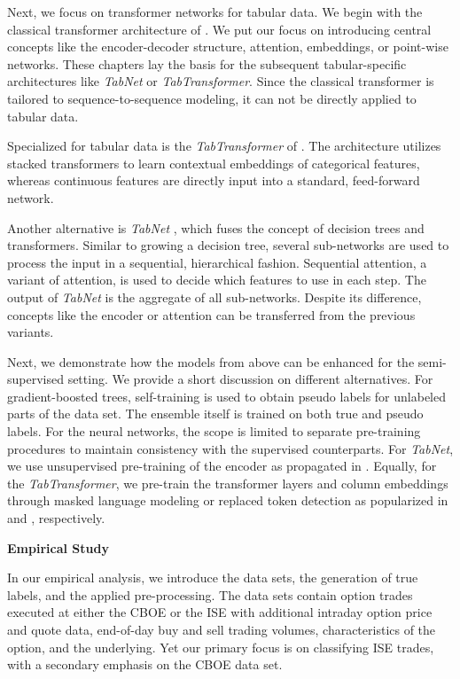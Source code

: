 Next, we focus on transformer networks for tabular data. We begin with the classical transformer architecture of \textcite{vaswaniAttentionAllYou2017}. We put our focus on introducing central concepts like the encoder-decoder structure, attention, embeddings, or point-wise networks. These chapters lay the basis for the subsequent tabular-specific architectures like \emph{TabNet} or \emph{TabTransformer}. Since the classical transformer is tailored to sequence-to-sequence modeling, it can not be directly applied to tabular data.

Specialized for tabular data is the \emph{TabTransformer} of \textcite{huangTabTransformerTabularData2020}. The architecture utilizes stacked transformers to learn contextual embeddings of categorical features, whereas continuous features are directly input into a standard, feed-forward network.

Another alternative is \emph{TabNet} \autocite{arikTabNetAttentiveInterpretable2020}, which fuses the concept of decision trees and transformers. Similar to growing a decision tree, several sub-networks are used to process the input in a sequential, hierarchical fashion. Sequential attention, a variant of attention, is used to decide which features to use in each step. The output of \emph{TabNet} is the aggregate of all sub-networks. Despite its difference, concepts like the encoder or attention can be transferred from the previous variants. 

Next, we demonstrate how the models from above can be enhanced for the semi-supervised setting. We provide a short discussion on different alternatives. For gradient-boosted trees, self-training \autocite{yarowskyUnsupervisedWordSense1995} is used to obtain pseudo labels for unlabeled parts of the data set. The ensemble itself is trained on both true and pseudo labels. For the neural networks, the scope is limited to separate pre-training procedures to maintain consistency with the supervised counterparts. For \emph{TabNet}, we use unsupervised pre-training of the encoder as propagated in \textcite{arikTabNetAttentiveInterpretable2020}. Equally, for the \emph{TabTransformer}, we pre-train the transformer layers and column embeddings through masked language modeling or replaced token detection as popularized in \textcite{devlinBERTPretrainingDeep2019} and \textcite{clarkELECTRAPretrainingText2020}, respectively. 

\textbf{Empirical Study}

In our empirical analysis, we introduce the data sets, the generation of true labels, and the applied pre-processing. The data sets contain option trades executed at either the \gls{CBOE} or the \gls{ISE} with additional intraday option price and quote data, end-of-day buy and sell trading volumes, characteristics of the option, and the underlying. Yet our primary focus is on classifying \gls{ISE} trades, with a secondary emphasis on the \gls{CBOE} data set. 

